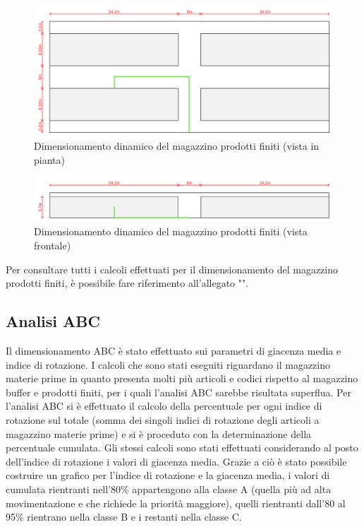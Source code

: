 \documentclass[11pt]{article}
\begin{document}
\begin{figure}[H]
    \centering
    \includegraphics[width=\textwidth]{images/Dimensionamento dinamico magazzino PF (vista in pianta).png}
    \caption{Dimensionamento dinamico del magazzino prodotti finiti (vista in pianta)}
    \label{fig: Dimensionamento dinamico del magazzino prodotti finiti (vista in pianta)}
\end{figure}

\begin{figure}[H]
    \centering
    \includegraphics[width=\textwidth]{images/Dimensionamento dinamico magazzino PF (vista frontale).png}
    \caption{Dimensionamento dinamico del magazzino prodotti finiti (vista frontale)}
    \label{fig: Dimensionamento dinamico del magazzino prodotti finiti (vista frontale)}
\end{figure}

\noindent
Per consultare tutti i calcoli effettuati per il dimensionamento del magazzino prodotti finiti, è possibile fare riferimento all'allegato "".
\newpage

\subsection{Analisi ABC}
Il dimensionamento ABC è stato effettuato sui parametri di giacenza media e indice di rotazione. I calcoli che sono stati eseguiti riguardano il magazzino materie prime in quanto presenta molti più articoli e codici rispetto al magazzino buffer e prodotti finiti, per i quali l'analisi ABC sarebbe risultata superflua.
Per l'analisi ABC si è effettuato il calcolo della percentuale per ogni indice di rotazione sul totale (somma dei singoli indici di rotazione degli articoli a magazzino materie prime) e si è proceduto con la determinazione della percentuale cumulata. Gli stessi calcoli sono stati effettuati considerando al posto dell'indice di rotazione i valori di giacenza media.
Grazie a ciò è stato possibile costruire un grafico per l'indice di rotazione e la giacenza media, i valori di cumulata rientranti nell'80\% appartengono alla classe A (quella più ad alta movimentazione e che richiede la priorità maggiore), quelli rientranti dall'80 al 95\% rientrano nella classe B e i restanti nella classe C.
\end{document}
